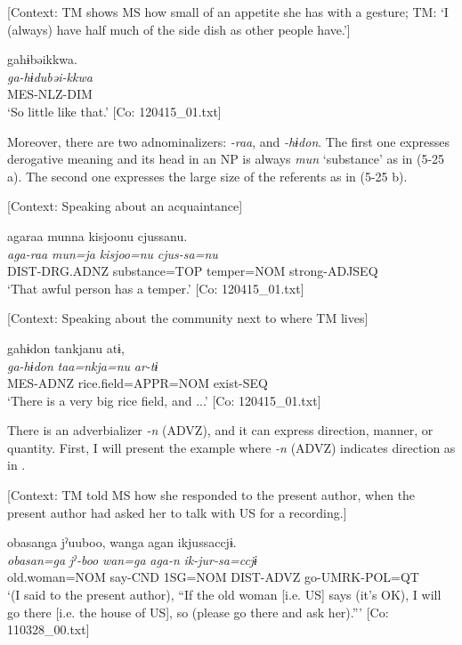  \ex \label{ex:5:24b} [Context: TM shows MS how small of an appetite she has with a gesture; TM: ‘I (always) have half much of the side dish as other people have.’]

\glll  gahɨbəikkwa.\\
\textit{ga-hɨdubəi{}-kkwa}\\
MES-NLZ-DIM\\
\glt ‘So little like that.’ [Co: 120415\_01.txt]
\z
\z

  Moreover, there are two adnominalizers: \textit{{}-raa}, and \textit{{}-hɨdon}. The first one expresses derogative meaning and its head in an NP is always \textit{mun} ‘substance’ as in (5-25 a). The second one expresses the large size of the referents as in (5-25 b).

\ea \label{ex:5:25}  \ea \label{ex:5:25a} [Context: Speaking about an acquaintance]

\glll  agaraa  munna  kisjoonu  cjussanu.\\
\textit{aga-raa}  \textit{mun=ja}  \textit{kisjoo=nu}  \textit{cjus-sa=nu}\\
DIST-DRG.ADNZ  substance=TOP  temper=NOM  strong-ADJSEQ\\
\glt ‘That awful person has a temper.’ [Co: 120415\_01.txt]

 \ex \label{ex:5:b} [Context: Speaking about the community next to where TM lives]

\glll  gahɨdon  tankjanu  atɨ,\\
\textit{ga-hɨdon}  \textit{taa=nkja=nu}  \textit{ar-tɨ}\\
MES-ADNZ  rice.field=APPR=NOM  exist-SEQ\\
\glt ‘There is a very big rice field, and ...’ [Co: 120415\_01.txt]
\z
\z

  There is an adverbializer \textit{-n} (ADVZ), and it can express direction, manner, or quantity. First, I will present the example where \textit{{}-n} (ADVZ) indicates direction as in .

\ea \label{ex:5:26}   [Context: TM told MS how she responded to the present author, when the present author had asked her to talk with US for a recording.]

\glll  {\textbar}obasan{\textbar}ga  jˀuuboo,  wanga  agan  ikjussaccjɨ.\\
\textit{obasan=ga}  \textit{jˀ-boo}  \textit{wan=ga}  \textit{aga-n}  \textit{ik-jur-sa=ccjɨ}\\
old.woman=NOM  say-CND  1SG=NOM  DIST-ADVZ  go-UMRK-POL=QT\\
\glt ‘(I said to the present author), “If the old woman [i.e. US] says (it’s OK), I will go there [i.e. the house of US], so (please go there and ask her).”’ [Co: 110328\_00.txt]
\z

